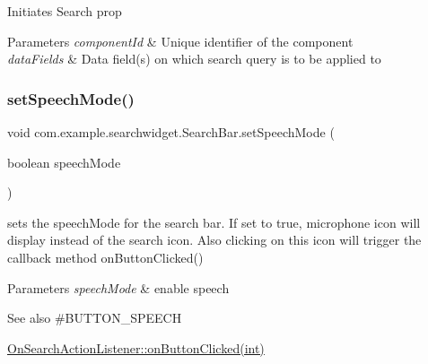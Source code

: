Initiates Search prop


\begin{DoxyParams}{Parameters}
{\em component\+Id} & Unique identifier of the component \\
\hline
{\em data\+Fields} & Data field(s) on which search query is to be applied to \\
\hline
\end{DoxyParams}
\mbox{\label{classcom_1_1example_1_1searchwidget_1_1_search_bar_abcb40436e4d424c4f5ac721d5f507412}} 
\subsubsection{\texorpdfstring{setSpeechMode()}{setSpeechMode()}}
{\footnotesize\ttfamily void com.\+example.\+searchwidget.\+Search\+Bar.\+set\+Speech\+Mode (\begin{DoxyParamCaption}\item[{boolean}]{speech\+Mode }\end{DoxyParamCaption})}

sets the speech\+Mode for the search bar. If set to true, microphone icon will display instead of the search icon. Also clicking on this icon will trigger the callback method on\+Button\+Clicked()


\begin{DoxyParams}{Parameters}
{\em speech\+Mode} & enable speech \\
\hline
\end{DoxyParams}
\begin{DoxySeeAlso}{See also}
\#\+B\+U\+T\+T\+O\+N\+\_\+\+S\+P\+E\+E\+CH 

\mbox{\hyperlink{interfacecom_1_1example_1_1searchwidget_1_1_search_bar_1_1_on_search_action_listener_aece2474e59c571f0364cbe3bfffc982a}{On\+Search\+Action\+Listener\+::on\+Button\+Clicked(int)}} 
\end{DoxySeeAlso}
\mbox{\label{classcom_1_1example_1_1searchwidget_1_1_search_bar_a2c7e29edef133c2885ed261f14dcd329}} 

